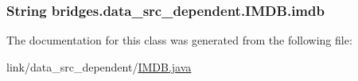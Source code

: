 \subsubsection[{imdb}]{\setlength{\rightskip}{0pt plus 5cm}String bridges.\+data\+\_\+src\+\_\+dependent.\+I\+M\+D\+B.\+imdb\hspace{0.3cm}{\ttfamily [protected]}}\label{classbridges_1_1data__src__dependent_1_1_i_m_d_b_a2913407abe6019a396d4a2ac086283df}


The documentation for this class was generated from the following file\+:\begin{DoxyCompactItemize}
\item 
link/data\+\_\+src\+\_\+dependent/\hyperlink{_i_m_d_b_8java}{I\+M\+D\+B.\+java}\end{DoxyCompactItemize}
